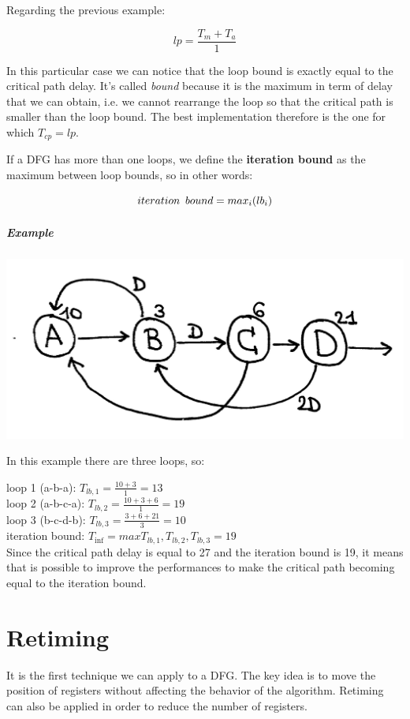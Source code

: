 Regarding the previous example:

$$ lp= \frac{T_m+T_a}{1} $$

In this particular case we can notice that the loop bound is exactly equal to the critical path delay. It's called \textit{bound} because it is the maximum in term of delay that we can obtain, i.e. we cannot rearrange the loop so that the critical path is smaller than the loop bound. The best implementation therefore is the one for which $T_{cp}=lp$.

If a DFG has more than one loops, we define the \textbf{iteration bound} as the maximum between loop bounds, so in other words:

$$ iteration \hspace{5 pt} bound= max_i (lb_i) $$

\subparagraph{Example}

\begin{center}
  \includegraphics[width=0.6\linewidth]{img/img1/10}
\end{center}

In this example there are three loops, so:

loop 1 (a-b-a): $T_{lb,1}=\frac{10+3}{1}=13$\\
loop 2 (a-b-c-a): $T_{lb,2}=\frac{10+3+6}{1}=19$\\
loop 3 (b-c-d-b): $T_{lb,3}=\frac{3+6+21}{3}=10$\\

iteration bound: $T_{\inf}=max{T_{lb,1},T_{lb,2},T_{lb,3}}=19$\\

Since the critical path delay is equal to 27 and the iteration bound is 19, it means that is possible to improve the performances to make the critical path becoming equal to the iteration bound.

\section{Retiming}
It is the first technique we can apply to a DFG. The key idea is to move the position of registers without affecting the behavior of the algorithm. Retiming can also be applied in order to reduce the number of registers.


